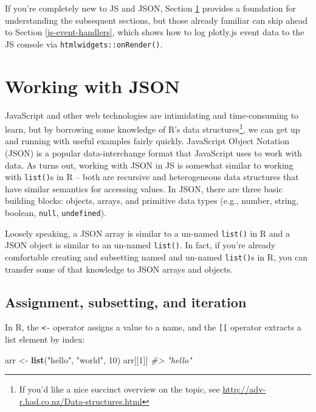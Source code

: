\documentclass[
  12pt,
]{krantz}
\newenvironment{Shaded}{\begin{snugshade}}{\end{snugshade}}
\newcommand{\CommentTok}[1]{\textcolor[rgb]{0.56,0.35,0.01}{\textit{#1}}}
\newcommand{\DecValTok}[1]{\textcolor[rgb]{0.00,0.00,0.81}{#1}}
\newcommand{\KeywordTok}[1]{\textcolor[rgb]{0.13,0.29,0.53}{\textbf{#1}}}
\newcommand{\NormalTok}[1]{#1}
\newcommand{\StringTok}[1]{\textcolor[rgb]{0.31,0.60,0.02}{#1}}
\begin{document}
If you're completely new to JS and JSON, Section \ref{json} provides a foundation for understanding the subsequent sections, but those already familiar can skip ahead to Section \ref{js-event-handlers}, which shows how to log plotly.js event data to the JS console via \texttt{htmlwidgets::onRender()}.

\hypertarget{json}{%
\chapter{Working with JSON}\label{json}}

JavaScript and other web technologies are intimidating and time-consuming to learn, but by borrowing some knowledge of R's data structures\footnote{If you'd like a nice succinct overview on the topic, see \url{http://adv-r.had.co.nz/Data-structures.html}}, we can get up and running with useful examples fairly quickly. JavaScript Object Notation (JSON) is a popular data-interchange format that JavaScript uses to work with data. As turns out, working with JSON in JS is somewhat similar to working with \texttt{list()}s in R -- both are recursive and heterogeneous data structures that have similar semantics for accessing values. In JSON, there are three basic building blocks: objects, arrays, and primitive data types (e.g., number, string, boolean, \texttt{null}, \texttt{undefined}).

Loosely speaking, a JSON array is similar to a un-named \texttt{list()} in R and a JSON object is similar to an un-named \texttt{list()}. In fact, if you're already comfortable creating and subsetting named and un-named \texttt{list()}s in R, you can transfer some of that knowledge to JSON arrays and objects.

\hypertarget{assignment-subsetting-and-iteration}{%
\section{Assignment, subsetting, and iteration}\label{assignment-subsetting-and-iteration}}

In R, the \texttt{\textless{}-} operator assigns a value to a name, and the \texttt{{[}{[}} operator extracts a list element by index:

\begin{Shaded}
\begin{Highlighting}[]
\NormalTok{arr <-}\StringTok{ }\KeywordTok{list}\NormalTok{(}\StringTok{"hello"}\NormalTok{, }\StringTok{"world"}\NormalTok{, }\DecValTok{10}\NormalTok{)}
\NormalTok{arr[[}\DecValTok{1}\NormalTok{]]}
\CommentTok{#> "hello"}
\end{Highlighting}
\end{Shaded}
\end{document}
